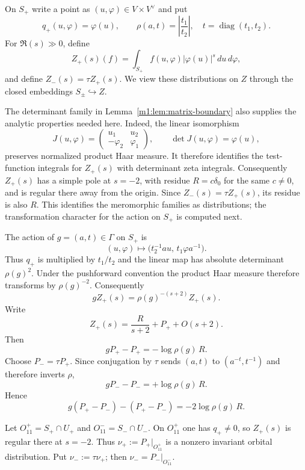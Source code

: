 On $S_+$ write a point as $(u,\varphi)\in V\times V^\vee$ and put
\[
    q_+(u,\varphi)=\varphi(u),
    \qquad
    \rho(a,t)=\left|\frac{t_1}{t_2}\right|,
    \quad
    t=\operatorname{diag}(t_1,t_2).
\]
For $\Re(s)\gg0$, define
\[
    Z_+(s)(f)=
    \int_{S_+}f(u,\varphi)|\varphi(u)|^s\,du\,d\varphi,
\]
and define \(Z_-(s)=\tau Z_+(s)\). We view these distributions on $Z$ through the closed embeddings
$S_\pm\hookrightarrow Z$.

The determinant family in Lemma~\ref{m1:lem:matrix-boundary} also supplies
the analytic properties needed here. Indeed, the linear isomorphism
\begin{equation}\label{m1:eq:determinant-pairing-isomorphism}
 J(u,\varphi)=\begin{pmatrix}u_1&u_2\\-\varphi_2&\varphi_1\end{pmatrix},
 \qquad \det J(u,\varphi)=\varphi(u),
\end{equation}
preserves normalized product Haar measure. It therefore identifies the
test-function integrals for $Z_+(s)$ with determinant zeta integrals.
Consequently $Z_+(s)$ has a simple pole at $s=-2$, with residue
$R=c\delta_0$ for the same $c\ne0$, and is regular there away from the
origin. Since $Z_-(s)=\tau Z_+(s)$, its residue is also $R$.
This identifies the meromorphic families as distributions; the
transformation character for the action on $S_+$ is computed next.


The action of $g=(a,t)\in \Gamma$ on $S_+$ is
\[
    (u,\varphi)
    \longmapsto
    \bigl(t_2^{-1}au,\,t_1\varphi a^{-1}\bigr).
\]
Thus $q_+$ is multiplied by $t_1/t_2$ and the linear map has
absolute determinant $\rho(g)^2$. Under the pushforward convention
the product Haar measure therefore transforms by $\rho(g)^{-2}$.  Consequently
\[
    gZ_+(s)=\rho(g)^{-(s+2)}Z_+(s).
\]
Write
\[
    Z_+(s)=\frac{R}{s+2}+P_++O(s+2).
\]
Then
\begin{equation}\label{m1:eq:Pplus-defect}
    gP_+-P_+=-\log\rho(g)\,R.
\end{equation}
Choose $P_-=\tau P_+$.  Since conjugation by $\tau$ sends $(a,t)$ to $(a^{-t},t^{-1})$ and therefore
inverts $\rho$,
\[
    gP_--P_-=+\log\rho(g)\,R.
\]
Hence
\begin{equation}\label{m1:eq:Ppm-defect}
    g(P_+-P_-)-(P_+-P_-)
    =-2\log\rho(g)\,R.
\end{equation}

Let \(O_{11}^+=S_+\cap U_+\) and \(O_{11}^-=S_-\cap U_-\). On $O_{11}^+$ one has $q_+\neq0$, so
$Z_+(s)$ is regular there at $s=-2$.
Thus \(\nu_+:=P_+|_{O_{11}^+}\) is a nonzero invariant orbital distribution.  Put \(\nu_-:=\tau\nu_+\);
then $\nu_-=P_-|_{O_{11}^-}$.

